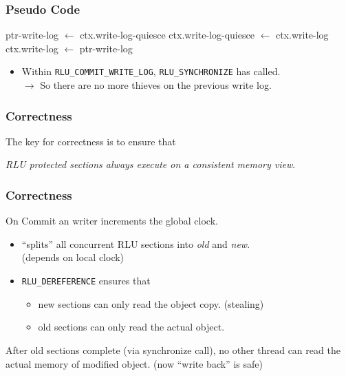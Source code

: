 \documentclass{beamer}
\begin{document}

\begin{frame}[t]
  \frametitle{Pseudo Code}
  \footnotesize{
  \begin{algorithmic}
    \State ptr-write-log $\leftarrow$ ctx.write-log-quiesce 
    \State ctx.write-log-quiesce $\leftarrow$ ctx.write-log
    \State ctx.write-log $\leftarrow$ ptr-write-log
    \EndFunction
  \end{algorithmic}
  }

  \begin{itemize}
  \item Within \texttt{RLU\_COMMIT\_WRITE\_LOG}, \texttt{RLU\_SYNCHRONIZE} has called.\\
    $\rightarrow$ So there are no more thieves on the previous write log.
  \end{itemize}

  
\end{frame}


\begin{frame}[t]
  \frametitle{Correctness}
  The key for correctness is to ensure that

  \begin{center}
    \emph{RLU protected sections always execute on a consistent memory view}.
  \end{center}

\end{frame}


\begin{frame}[t]
  \frametitle{Correctness}

  On Commit an writer increments the global clock.
  \begin{itemize}
  \item ``splits'' all concurrent RLU sections into \emph{old} and \emph{new}.\\
    (depends on local clock)
  \item \texttt{RLU\_DEREFERENCE} ensures that
    \begin{itemize}
    \item new sections can only read the object copy. (stealing)
    \item old sections can only read the actual object.
    \end{itemize}
  \end{itemize}

  \begin{center}
    After old sections complete (via synchronize call), no other thread can read
    the actual memory of modified object. (now ``write back'' is safe)
  \end{center}

\end{frame}
\end{document}
